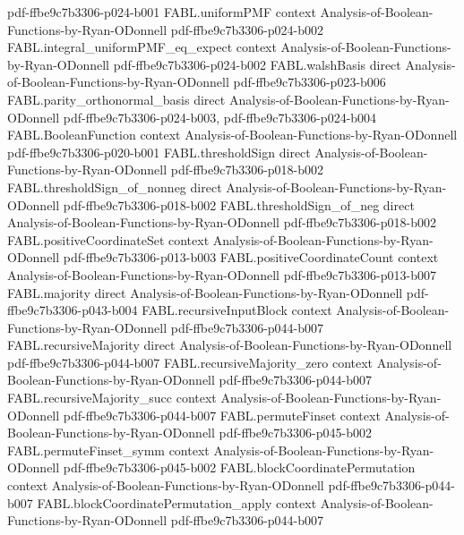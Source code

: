 \begin{theorem}
  {pdf-ffbe9c7b3306-p024-b001}
\proofstep
  {FABL.uniformPMF}
  {context}
  {Analysis-of-Boolean-Functions-by-Ryan-ODonnell}
  {pdf-ffbe9c7b3306-p024-b002}
\proofstep
  {FABL.integral_uniformPMF_eq_expect}
  {context}
  {Analysis-of-Boolean-Functions-by-Ryan-ODonnell}
  {pdf-ffbe9c7b3306-p024-b002}
\proofstep
  {FABL.walshBasis}
  {direct}
  {Analysis-of-Boolean-Functions-by-Ryan-ODonnell}
  {pdf-ffbe9c7b3306-p023-b006}
\proofstep
  {FABL.parity_orthonormal_basis}
  {direct}
  {Analysis-of-Boolean-Functions-by-Ryan-ODonnell}
  {pdf-ffbe9c7b3306-p024-b003,
    pdf-ffbe9c7b3306-p024-b004}
\proofstep
  {FABL.BooleanFunction}
  {context}
  {Analysis-of-Boolean-Functions-by-Ryan-ODonnell}
  {pdf-ffbe9c7b3306-p020-b001}
\proofstep
  {FABL.thresholdSign}
  {direct}
  {Analysis-of-Boolean-Functions-by-Ryan-ODonnell}
  {pdf-ffbe9c7b3306-p018-b002}
\proofstep
  {FABL.thresholdSign_of_nonneg}
  {direct}
  {Analysis-of-Boolean-Functions-by-Ryan-ODonnell}
  {pdf-ffbe9c7b3306-p018-b002}
\proofstep
  {FABL.thresholdSign_of_neg}
  {direct}
  {Analysis-of-Boolean-Functions-by-Ryan-ODonnell}
  {pdf-ffbe9c7b3306-p018-b002}
\proofstep
  {FABL.positiveCoordinateSet}
  {context}
  {Analysis-of-Boolean-Functions-by-Ryan-ODonnell}
  {pdf-ffbe9c7b3306-p013-b003}
\proofstep
  {FABL.positiveCoordinateCount}
  {context}
  {Analysis-of-Boolean-Functions-by-Ryan-ODonnell}
  {pdf-ffbe9c7b3306-p013-b007}
\proofstep
  {FABL.majority}
  {direct}
  {Analysis-of-Boolean-Functions-by-Ryan-ODonnell}
  {pdf-ffbe9c7b3306-p043-b004}
\proofstep
  {FABL.recursiveInputBlock}
  {context}
  {Analysis-of-Boolean-Functions-by-Ryan-ODonnell}
  {pdf-ffbe9c7b3306-p044-b007}
\proofstep
  {FABL.recursiveMajority}
  {direct}
  {Analysis-of-Boolean-Functions-by-Ryan-ODonnell}
  {pdf-ffbe9c7b3306-p044-b007}
\proofstep
  {FABL.recursiveMajority_zero}
  {context}
  {Analysis-of-Boolean-Functions-by-Ryan-ODonnell}
  {pdf-ffbe9c7b3306-p044-b007}
\proofstep
  {FABL.recursiveMajority_succ}
  {context}
  {Analysis-of-Boolean-Functions-by-Ryan-ODonnell}
  {pdf-ffbe9c7b3306-p044-b007}
\proofstep
  {FABL.permuteFinset}
  {context}
  {Analysis-of-Boolean-Functions-by-Ryan-ODonnell}
  {pdf-ffbe9c7b3306-p045-b002}
\proofstep
  {FABL.permuteFinset_symm}
  {context}
  {Analysis-of-Boolean-Functions-by-Ryan-ODonnell}
  {pdf-ffbe9c7b3306-p045-b002}
\proofstep
  {FABL.blockCoordinatePermutation}
  {context}
  {Analysis-of-Boolean-Functions-by-Ryan-ODonnell}
  {pdf-ffbe9c7b3306-p044-b007}
\proofstep
  {FABL.blockCoordinatePermutation_apply}
  {context}
  {Analysis-of-Boolean-Functions-by-Ryan-ODonnell}
  {pdf-ffbe9c7b3306-p044-b007}

\end{theorem}
